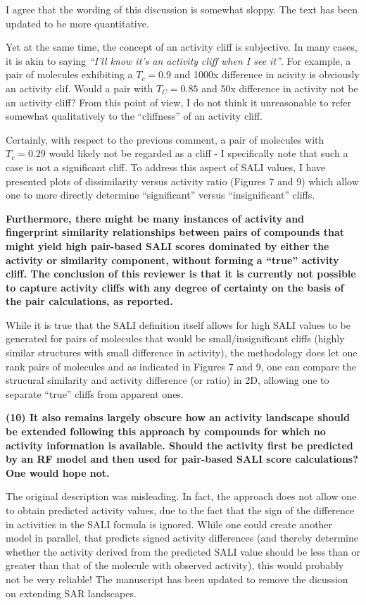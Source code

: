 \documentclass[letterpaper, 12pt]{article}
\begin{document}
I agree that the wording of this discussion is somewhat sloppy. The text has been updated to be more
quantitative.

Yet at the same time, the concept of an activity cliff is subjective. In many cases, it is
akin to saying \emph{``I'll know it's an activity cliff when I see it''}. For example, a pair of
molecules exhibiting a $T_c = 0.9$ and 1000x difference in acivity is obviously an activity
clif. Would a pair with $T_C = 0.85$ and 50x difference in activity not be an activity cliff? From
this point of view, I do not think it unreasonable to refer somewhat qualitatively to the
``cliffness'' of an activity cliff.

Certainly, with respect to the previous comment, a pair of molecules with $T_c = 0.29$ would likely
not be regarded as a cliff - I specifically note that such a case is not a significant cliff. To
address this aspect of SALI values, I have presented plots of dissimilarity versus activity ratio
(Figures 7 and 9) which allow one to more directly determine ``significant'' versus
``insignificant'' cliffs.

\textbf{Furthermore, there might be many instances of activity and fingerprint similarity
  relationships between pairs of compounds that might yield high pair-based SALI scores dominated by
  either the activity or similarity component, without forming a “true” activity cliff. The
  conclusion of this reviewer is that it is currently not possible to capture activity cliffs with
  any degree of certainty on the basis of the pair calculations, as reported.}

While it is true that the SALI definition itself allows for high SALI values to be generated for
pairs of molecules that would be small/insignificant cliffs (highly similar structures with small
difference in activity), the methodology does let one rank pairs of molecules and as indicated in
Figures 7 and 9, one can compare the strucural similarity and activity difference (or ratio) in 2D,
allowing one to separate ``true'' cliffs from apparent ones.

\textbf{(10) It also remains largely obscure how an activity landscape should be extended following
  this approach by compounds for which no activity information is available. Should the activity
  first be predicted by an RF model and then used for pair-based SALI score calculations?  One would
  hope not.}

The original description was misleading. In fact, the approach does not allow one to obtain
predicted activity values, due to the fact that the sign of the difference in activities in the SALI
formula is ignored. While one could create another model in parallel, that predicts signed activity
differences (and thereby determine whether the activity derived from the predicted SALI value should
be less than or greater than that of the molecule with observed activity), this would probably not
be very reliable! The manuscript has been updated to remove the dicussion on extending SAR
landscapes.
\end{document}
